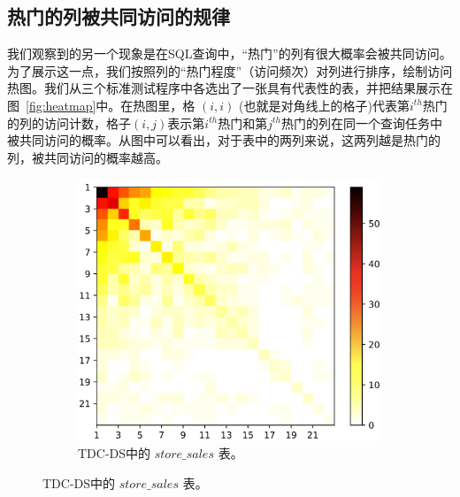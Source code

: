 \subsection{热门的列被共同访问的规律}
我们观察到的另一个现象是在SQL查询中，“热门”的列有很大概率会被共同访问。为了展示这一点，我们按照列的“热门程度”（访问频次）对列进行排序，绘制访问热图。我们从三个标准测试程序中各选出了一张具有代表性的表，并把结果展示在图~\ref{fig:heatmap}中。在热图里，格 $(i,i)$ (也就是对角线上的格子)代表第$i^{th}$热门的列的访问计数，格子$(i,j)$表示第$i^{th}$热门和第$j^{th}$热门的列在同一个查询任务中被共同访问的概率。从图中可以看出，对于表中的两列来说，这两列越是热门的列，被共同访问的概率越高。

\begin{figure}[]
    \centering
    \begin{subfigure}[t]{0.5\textwidth}
        \centering
        \includegraphics[width=1\textwidth]{img/motivation/tpc-ds-store_sales}
        \caption{TDC-DS中的 $store\_sales$ 表。}
        \label{fig:ds_count_cdf}
    \end{subfigure}%


\end{figure}
